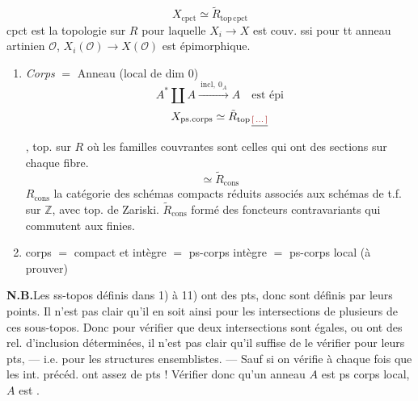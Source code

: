 \documentclass[11pt,a4paper]{article}
\begin{document}
\[
  X_{\mathrm{cpct}} \simeq \tilde{R}_{\mathrm{top\,cpct}}
\]
cpct est la topologie sur $R$ pour laquelle $X_{i} \to X$ est couv. ssi pour
tt anneau artinien  \struck{\ill{}} 
$\mathcal{O}$, $X_{i}(\mathcal{O}) \to X(\mathcal{O})$ est épimorphique.


\begin{enumerate}
  \item[11)] \emph{Corps} $=$  Anneau
     (local de
    dim $0$) 
    \[
      A^{\ast} \amalg A \xrightarrow{\ \mathrm{incl},\ 0_{A}\ } A
      \quad \text{est épi}
    \]
    \[
      X_{\mathrm{ps.corps}} \simeq \tilde{R}_{\mathrm{top\,\struck{\ill{}}}}
    \]
    , top. sur $R$ où les familles couvrantes sont \struck{\ill{}}
    celles qui ont des sections sur chaque fibre.
    \[
      \simeq \tilde{R}_{\mathrm{cons}}
    \]
    $R_{\mathrm{cons}}$ la catégorie des schémas compacts réduits associés aux
    schémas de t.f. sur $\mathbb{Z}$, avec top. de Zariski.
    $\tilde{R}_{\mathrm{cons}}$ formé des foncteurs contravariants qui
    commutent aux  finies.
  \item[12)] corps $=$ compact et \struck{\ill{}} intègre $=$ ps-corps
    intègre  $=$ ps-corps local \struck{\ill{}} (à prouver)
\end{enumerate}


\textbf{N.B.}\quad Les ss-topos définis dans 1) à 11) \struck{\ill{}} ont des
pts, donc sont définis par leurs points. Il n'est pas clair qu'il en soit
 ainsi pour les intersections de plusieurs de ces sous-topos. Donc
pour vérifier que deux intersections sont égales,  ou ont
des rel. d'inclusion déterminées, il n'est pas clair qu'il suffise de le
vérifier pour leurs pts, — i.e. pour les structures ensemblistes. — Sauf si on
vérifie à chaque fois que les int. précéd. ont assez de pts ! Vérifier donc
qu'un anneau \struck{\ill{}}   $A$ est
ps corps local, $A$ est \struck{\ill{}} .
\end{document}
